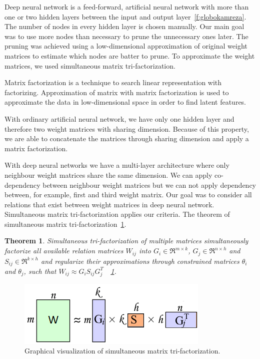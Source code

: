 \documentclass{article} %
\newtheorem{theorem}{Theorem}[section]
\begin{document}
Deep neural network is a feed-forward, artificial neural network with more than
one or two hidden layers between the input and output
layer~\ref{f:globokamreza}. The number of nodes in every hidden layer is chosen
manually. Our main goal was to use more nodes than necessary to prune the
unnecessary ones later. The pruning was achieved using a low-dimensional
approximation of original weight matrices to estimate which nodes are batter to
prune. To approximate the weight matrices, we used simultaneous matrix
tri-factorization.

Matrix factorization is a technique to search linear representation with
factorizing. Approximation of matrix with matrix factorization is used to
approximate the data in low-dimensional space in order to find latent features.

With ordinary artificial neural network, we have only one hidden layer and
therefore two weight matrices with sharing dimension. Because of this property,
we are able to concatenate the matrices through sharing dimension and apply a
matrix factorization.

With deep neural networks we have a multi-layer architecture where only
neighbour weight matrices share the same dimension. We can apply co-dependency
between neighbour weight matrices but we can not apply dependency between, for
example, first and third weight matrix. Our goal was to consider all relations
that exist between weight matrices in deep neural network. Simultaneous matrix
tri-factorization applies our criteria. The theorem of simultaneous matrix 
tri-factorization~\ref{t:2}. 


\begin{theorem}\label{t:2}
Simultaneous tri-factorization of multiple matrices simultaneously 
factorize all available relation matrices $W_{ij}$ into $G_i \in \Re^{m \times 
k}$, $G_j \in \Re^{n \times h}$ and $S_{ij} \in \Re^{k \times h}$ and regularize 
their approximations through constrained matrices $\theta_i$ and $\theta_j$, 
such that $W_{ij} \approx G_iS_{ij}G_j^T$~\cite{zitnik2015data}~\ref{f:mf2}.
\end{theorem} 

\begin{figure}[!ht]
\centering 
\includegraphics[width=.5\textwidth]{mf2.png}
\caption{Graphical visualization of simultaneous matrix tri-factorization.}
\label{f:mf2}
\end{figure}
\end{document}
